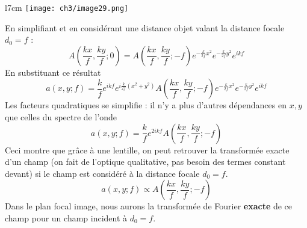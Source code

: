 	\begin{wrapfigure}[10]{l}{7cm}
	\vspace{-5mm}
	\texttt{[image: ch3/image29.png]}
	\end{wrapfigure}
En simplifiant et en considérant une distance objet valant la distance focale $d_0=f$ :
\begin{equation}
A(\frac{kx}{f},\frac{ky}{f};0) = A(\frac{kx}{f},\frac{ky}{f};-f)e^{-\frac{k}{2f}x^2}e^{-\frac{k}{2f}y^2}
e^{ikf}
\end{equation}
En substituant ce résultat 
\begin{equation}
a(x,y;f) = \dfrac{k}{f}e^{ikf} e^{i\frac{k}{2f}(x^2+y^2)}A(\frac{kx}{f},\frac{ky}{f};-f)e^{-\frac{k}{2f}x^2}e^{-\frac{k}{2f}y^2}
e^{ikf}
\end{equation}
Les facteurs quadratiques se simplifie : il n'y a plus d'autres dépendances en $x,y$ que celles du 
spectre de l'onde
\begin{equation}
a(x,y;f) = \dfrac{k}{f}e^{2ikf} A\left(\frac{kx}{f},\frac{ky}{f};-f\right)
\end{equation}
Ceci montre que grâce à une lentille, on peut retrouver la transformée exacte d'un champ (on fait de 
l'optique qualitative, pas besoin des termes constant devant) si le champ est considéré à la distance 
focale $d_0=f$. 
\begin{equation}
a(x,y;f) \propto A\left(\frac{kx}{f},\frac{ky}{f};-f\right)
\end{equation}
Dans le plan focal image, nous aurons la transformée de Fourier \textbf{exacte} de ce champ pour un 
champ incident à $d_0=f$.







